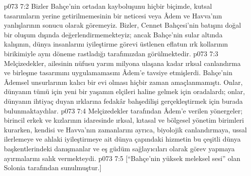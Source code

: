 \vs p073 7:2 Bizler Bahçe’nin ortadan kayboluşunu hiçbir biçimde, kutsal tasarımların yerine getirilmemesinin bir neticesi veya Âdem ve Havva’nın yanlışlarının sonucu olarak göremeyiz. Bizler, Cennet Bahçesi’nin batışını doğal bir oluşum dışında değerlendirmemekteyiz; ancak Bahçe’nin sular altında kalışının, dünya insanlarını iyileştirme görevi üstlenen eflatun ırk kollarının birikimiyle aynı döneme rastladığı tarafımızdan görülmektedir.
\vs p073 7:3 Melçizedekler, ailesinin nüfusu yarım milyona ulaşana kadar ırksal canlandırma ve birleşme tasarımını uygulamamasını Âdem’e tavsiye etmişlerdi. Bahçe’nin Âdemsel unsurlarının kalıcı bir evi olması hiçbir zaman amaçlanmamıştı. Onlar, dünyanın tümü için yeni bir yaşamın elçileri haline gelmek için oradalardı; onlar, dünyanın ihtiyaç duyan ırklarına fedakâr bahşedilişi gerçekleştirmek için burada bulunmaktaydılar.
\vs p073 7:4 Melçizedekler tarafından Âdem’e verilen yönergeler; birincil erkek ve kızlarının idaresinde ırksal, kıtasal ve bölgesel yönetim birimleri kurarken, kendisi ve Havva’nın zamanlarını ayrıca, biyolojik canlandırmaya, ussal ilerlemeye ve ahlaki iyileştirmeye ait dünya çapındaki hizmetin bu çeşitli dünya başkentlerindeki danışmanlar ve eş güdüm sağlayıcıları olarak görev yapmaya ayırmalarını salık vermekteydi.
\vs p073 7:5 [“Bahçe’nin {yüksek} meleksel sesi” olan Solonia tarafından sunulmuştur.]
